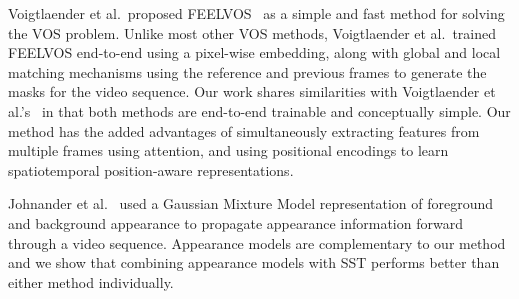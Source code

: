 Voigtlaender et al.\ proposed FEELVOS~\cite{feelvos2019} as a simple and fast
method for solving the VOS problem.
Unlike most other VOS methods, Voigtlaender et al.\ trained FEELVOS end-to-end
using a pixel-wise embedding, along with global and local matching mechanisms
using the reference and previous frames to generate the masks for the video
sequence.
Our work shares similarities with Voigtlaender et al.'s~\cite{feelvos2019} in
that both methods are end-to-end trainable and conceptually simple.
Our method has the added advantages of simultaneously extracting features from
multiple frames using attention, and using positional encodings to learn
spatiotemporal position-aware representations.

Johnander et al.~\cite{johnander2019agenerative} used a Gaussian Mixture Model
representation of foreground and background appearance to propagate appearance
information forward through a video sequence.
Appearance models are complementary to our method and we show that combining
appearance models with SST performs better than either method individually.






